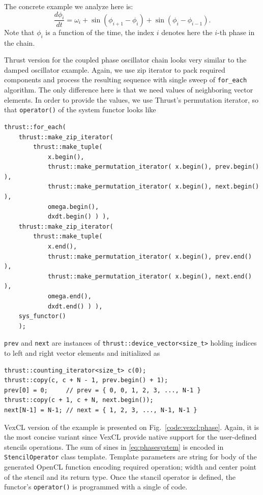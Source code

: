 \documentclass[1p]{elsarticle}
\newcommand{\code}[1]{\lstinline|#1|}
\newcommand{\figref}[1]{Fig.~\ref{#1}}
\begin{document}
The concrete example we analyze here is:
\begin{equation} \label{eq:phasesystem}
    \frac{d\phi_i}{dt} = \omega_i + \sin( \phi_{i+1} - \phi_i) + \sin( \phi_i
    - \phi_{i-1}).
\end{equation}
Note that $\phi_i$ is a function of the time, the index $i$ denotes here the
$i$-th phase in the chain.

Thrust version for the coupled phase oscillator chain looks very similar to the
damped oscillator example. Again, we use zip iterator to pack required
components and process the resulting sequence with single sweep of
\code{for_each} algorithm. The only difference here is that we need values of
neighboring vector elements. In order to provide the values, we use Thrust's
permutation iterator, so that \code{operator()} of the system functor looks
like
\begin{lstlisting}[frame=leftline]
thrust::for_each(
    thrust::make_zip_iterator(
        thrust::make_tuple(
            x.begin(),
            thrust::make_permutation_iterator( x.begin(), prev.begin() ),
            thrust::make_permutation_iterator( x.begin(), next.begin() ),
            omega.begin(),
            dxdt.begin() ) ),
    thrust::make_zip_iterator(
        thrust::make_tuple(
            x.end(),
            thrust::make_permutation_iterator( x.begin(), prev.end() ),
            thrust::make_permutation_iterator( x.begin(), next.end() ),
            omega.end(),
            dxdt.end() ) ),
    sys_functor()
    );
\end{lstlisting}
\code{prev} and \code{next} are instances of
\code{thrust::device_vector<size_t>} holding indices to left and right vector
elements and initialized as
\begin{lstlisting}[frame=leftline]
thrust::counting_iterator<size_t> c(0);
thrust::copy(c, c + N - 1, prev.begin() + 1);
prev[0] = 0;     // prev = { 0, 0, 1, 2, 3, ..., N-1 }
thrust::copy(c + 1, c + N, next.begin());
next[N-1] = N-1; // next = { 1, 2, 3, ..., N-1, N-1 }
\end{lstlisting}

VexCL version of the example is presented on \figref{code:vexcl:phase}. Again,
it is the most concise variant since VexCL provide native support for the
user-defined stencils operations. The sum of sines in \eqref{eq:phasesystem} is
encoded in \code{StencilOperator} class template. Template parameters are
string for body of the generated OpenCL function encoding required operation;
width and center point of the stencil and its return type. Once the stancil
operator is defined, the functor's \code{operator()} is programmed with a
single of code.
\end{document}
